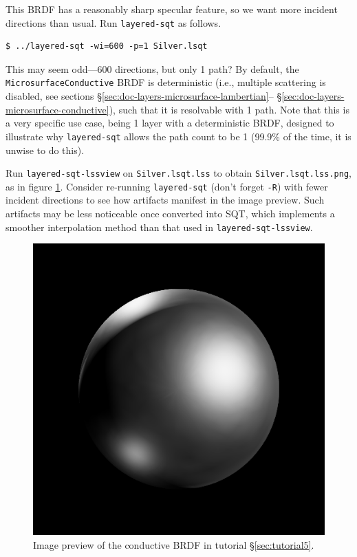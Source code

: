 \documentclass[
    twoside,
    twocolumn,
    letterpaper,
    10pt]{article}
\newcommand\namett[2]{{\color{code#1}\texttt{#2}}}
\begin{document}
This BRDF has a reasonably sharp specular feature, so we want 
more incident directions than usual. Run \texttt{layered-sqt} as follows.
\begin{verbatim}
$ ../layered-sqt -wi=600 -p=1 Silver.lsqt
\end{verbatim}
This may seem odd---600 directions, but only 1 path? By default, the 
\namett{purple}{MicrosurfaceConductive} BRDF is deterministic (i.e., multiple 
scattering is disabled, see sections 
\S\ref{sec:doc-layers-microsurface-lambertian}--%
\S\ref{sec:doc-layers-microsurface-conductive}), such that it 
is resolvable with 1 path. Note that this is a very specific use
case, being 1 layer with a deterministic BRDF, designed to illustrate
why \texttt{layered-sqt} allows the path count to be 1 (99.9\% of the
time, it is unwise to do this).

Run \texttt{layered-sqt-lssview} on \texttt{Silver.lsqt.lss} to obtain
\texttt{Silver.lsqt.lss.png}, as in figure \ref{fig:tutorial5}. Consider
re-running \texttt{layered-sqt} (don't forget \texttt{-R}) with fewer
incident directions to see how artifacts manifest in the image
preview. Such artifacts may be less noticeable once converted into 
SQT, which implements a smoother interpolation method than that used 
in \texttt{layered-sqt-lssview}.


\begin{figure}
\begin{center}
    \includegraphics[width=0.75\columnwidth]{tutorial5.png}
    \caption{Image preview of the conductive BRDF in tutorial 
    \S\ref{sec:tutorial5}.
    \label{fig:tutorial5}}
\end{center}
\end{figure}
\end{document}
